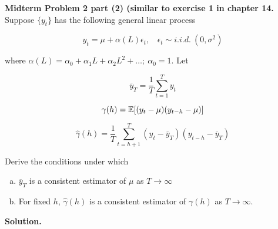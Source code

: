 \textbf{Midterm Problem 2 part (2) (similar to exercise 1 in chapter 14.} Suppose \(\{y_t\}\) has the following general linear process

\[
y_t = \mu + \alpha(L)\epsilon_t, \ \ \ \ \epsilon_t \sim i.i.d. \ (0, \sigma^2)
\]

where \(\alpha(L) = \alpha_0 + \alpha_1 L + \alpha_2 L^2 + \ldots; \ \alpha_0 = 1\). Let 

\[
\overline{y}_T = \frac{1}{T} \sum_{t=1}^T y_t
\]

\[
\gamma(h) = \mathbb{E}[(y_t - \mu)(y_{t-h} - \mu)]
\]

\[
\hat{\gamma}(h) = \frac{1}{T} \sum_{t=h+1}^T(y_t - \overline{y}_T)(y_{t-h} - \overline{y}_T)
\]

Derive the conditions under which

\begin{enumerate}[(a)]

\item \(\overline{y}_T\) is a consistent estimator of \(\mu\) as \(T \to \infty\)

\item For fixed \(h\), \(\hat{\gamma}(h)\) is a consistent estimator of \(\gamma(h)\) as \(T \to \infty\).

\end{enumerate}

\textbf{Solution.}

